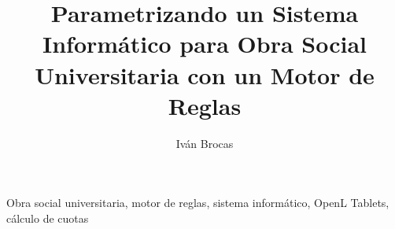 \documentclass[12pt,a4paper,spanish,twocolumn]{article}
\title{Parametrizando un Sistema Informático para Obra Social Universitaria con un Motor de Reglas}
\author{Iván Brocas}
\begin{document}
\thistitle

\justifying


\begin{keywords}
Obra social universitaria, motor de reglas, sistema informático, OpenL Tablets, cálculo de cuotas
\end{keywords}



















\printbibliography


\end{document}
